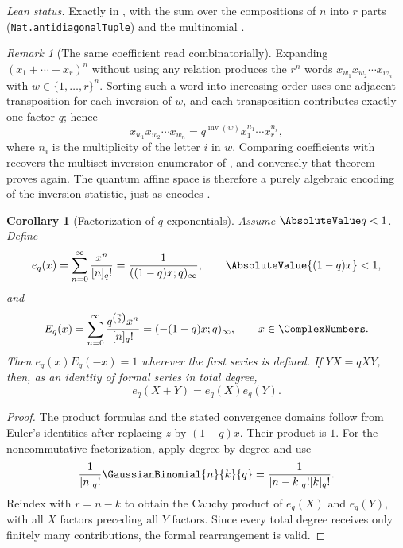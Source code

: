\documentclass[11pt,a4paper,oneside,openany]{book}
\newtheorem{corollary}[corollary]{Corollary}
\theoremstyle{definition}
\theoremstyle{remark}
\newtheorem{remark}[remark]{Remark}
\newcommand{\InversionNumber}[1]{\operatorname{inv}(#1)}
\begin{document}
\emph{Lean status.}  Exactly  in
, with the sum over the compositions of $n$ into $r$ parts
(\texttt{Nat.antidiagonalTuple}) and the multinomial .

\begin{remark}[The same coefficient read combinatorially]\label{rem:quantum-multinomial-inversions}
Expanding $(x_1+\cdots+x_r)^n$ without using any relation produces the $r^n$ words $x_{w_1}x_{w_2}\cdots x_{w_n}$ with $w\in\{1,\dots,r\}^n$.  Sorting such a word into increasing order uses one adjacent transposition for each inversion of $w$, and each transposition contributes exactly one factor $q$; hence
\[
 x_{w_1}x_{w_2}\cdots x_{w_n}=q^{\InversionNumber{w}}x_1^{n_1}\cdots x_r^{n_r},
\]
where $n_i$ is the multiplicity of the letter $i$ in $w$.  Comparing coefficients with  recovers the multiset inversion enumerator of , and conversely that theorem proves  again.  The quantum affine space is therefore a purely algebraic encoding of the inversion statistic, just as  encodes .
\end{remark}

\begin{corollary}[Factorization of $q$-exponentials]\label{cor:qexp-factor}
Assume $\AbsoluteValue q<1$.  Define
\[
 e_q(x)=\sum_{n=0}^{\infty}\frac{x^n}{[n]_q!}
 =\frac1{((1-q)x;q)_\infty},
 \qquad \AbsoluteValue{(1-q)x}<1,
\]
and
\[
 E_q(x)=\sum_{n=0}^{\infty}\frac{q^{\binom n2}x^n}{[n]_q!}
 =(-(1-q)x;q)_\infty,
 \qquad x\in\ComplexNumbers.
\]
Then $e_q(x)E_q(-x)=1$ wherever the first series is defined.  If $YX=qXY$, then, as an identity of formal series in total degree,
\[
 e_q(X+Y)=e_q(X)e_q(Y).
\]
\end{corollary}

\begin{proof}
The product formulas and the stated convergence domains follow from Euler's identities after replacing $z$ by $(1-q)x$.  Their product is $1$.  For the noncommutative factorization, apply  degree by degree and use
\[
 \frac1{[n]_q!}\GaussianBinomial{n}{k}{q}
 =\frac1{[n-k]_q![k]_q!}.
\]
Reindex with $r=n-k$ to obtain the Cauchy product of $e_q(X)$ and $e_q(Y)$, with all $X$ factors preceding all $Y$ factors.  Since every total degree receives only finitely many contributions, the formal rearrangement is valid.
\end{proof}
\end{document}
